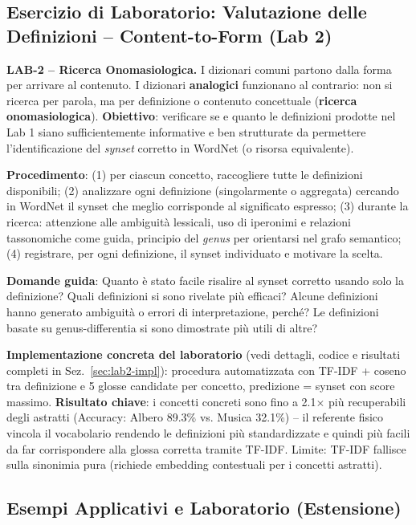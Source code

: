 \documentclass[12pt,a4paper]{article}
\begin{document}
\subsection{Esercizio di Laboratorio: Valutazione delle Definizioni -- Content-to-Form (Lab 2)}

\begin{defbox}
\textbf{LAB-2 -- Ricerca Onomasiologica.}
I dizionari comuni partono dalla forma per arrivare al contenuto. I dizionari \textbf{analogici} funzionano al contrario: non si ricerca per parola, ma per definizione o contenuto concettuale (\textbf{ricerca onomasiologica}). \textbf{Obiettivo}: verificare se e quanto le definizioni prodotte nel Lab 1 siano sufficientemente informative e ben strutturate da permettere l'identificazione del \emph{synset} corretto in WordNet (o risorsa equivalente).
\end{defbox}

\textbf{Procedimento}: (1) per ciascun concetto, raccogliere tutte le definizioni disponibili; (2) analizzare ogni definizione (singolarmente o aggregata) cercando in WordNet il synset che meglio corrisponde al significato espresso; (3) durante la ricerca: attenzione alle ambiguit\`a lessicali, uso di iperonimi e relazioni tassonomiche come guida, principio del \emph{genus} per orientarsi nel grafo semantico; (4) registrare, per ogni definizione, il synset individuato e motivare la scelta.

\textbf{Domande guida}: Quanto \`e stato facile risalire al synset corretto usando solo la definizione? Quali definizioni si sono rivelate pi\`u efficaci? Alcune definizioni hanno generato ambiguit\`a o errori di interpretazione, perch\'e? Le definizioni basate su genus-differentia si sono dimostrate pi\`u utili di altre?

\textbf{Implementazione concreta del laboratorio} (vedi dettagli, codice e risultati completi in Sez.~\ref{sec:lab2-impl}): procedura automatizzata con TF-IDF + coseno tra definizione e 5 glosse candidate per concetto, predizione = synset con score massimo. \textbf{Risultato chiave}: i concetti concreti sono fino a 2.1$\times$ pi\`u recuperabili degli astratti (Accuracy: Albero 89.3\% vs. Musica 32.1\%) -- il referente fisico vincola il vocabolario rendendo le definizioni pi\`u standardizzate e quindi pi\`u facili da far corrispondere alla glossa corretta tramite TF-IDF. Limite: TF-IDF fallisce sulla sinonimia pura (richiede embedding contestuali per i concetti astratti).

\subsection{Esempi Applicativi e Laboratorio (Estensione)}
\end{document}
